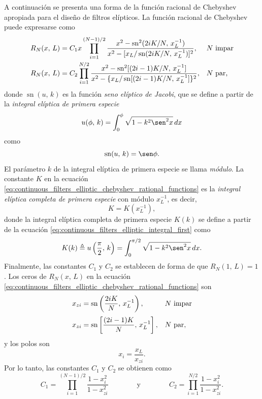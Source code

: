 \documentclass[a4paper]{report}
\begin{document}
A continuación se presenta una forma de la función racional de Chebyshev apropiada para el diseño de filtros elípticos. La función racional de Chebyshev puede expresarse como
\begin{equation}\label{eq:continuous_filters_elliptic_chebyshev_rational_functions}
 \begin{array}{ll}
  \displaystyle R_N(x,\,L)=C_1x\prod_{i=1}^{(N-1)/2}\frac{x^2-\operatorname{sn}^2(2iK/N,\,x_L^{-1})}{x^2-[x_L/\operatorname{sn}(2iK/N,\,x_L^{-1})]^2},& N\textrm{ impar}\\[\bigskipamount]
  \displaystyle R_N(x,\,L)=C_2\prod_{i=1}^{N/2}\frac{x^2-\operatorname{sn}^2[(2i-1)K/N,\,x_L^{-1}]}{x^2-\{x_L/\operatorname{sn}[(2i-1)K/N,\,x_L^{-1}]\}^2},& N\textrm{ par,}
 \end{array}
\end{equation}
donde \(\operatorname{sn}(u,\,k)\) es la función \emph{seno elíptico de Jacobi}, que se define a partir de la \emph{integral elíptica de primera especie}
\begin{equation}\label{eq:continuous_filters_elliptic_integral_first}
 u(\phi,\,k)=\int_0^\phi\sqrt{1-k^2\sen^2x}\,dx
\end{equation}
como
\begin{equation}\label{eq:continuous_filters_elliptic_sine}
 \operatorname{sn}(u,\,k)=\sen\phi. 
\end{equation}
El parámetro \(k\) de la integral elíptica de primera especie se llama \emph{módulo}. La constante \(K\) en la ecuación \ref{eq:continuous_filters_elliptic_chebyshev_rational_functions} es la \emph{integral elíptica completa de primera especie} con módulo \(x_L^{-1}\), es decir,
\[
 K=K(x_L^{-1}),
\]
donde la integral elíptica completa de primera especie \(K(k)\) se define a partir de la ecuación \ref{eq:continuous_filters_elliptic_integral_first} como 
\begin{equation}\label{eq:continuous_filters_elliptic_integral_first_complete}
 K(k)\triangleq u\left(\frac{\pi}{2},\,k\right)=\int_0^{\pi/2}\sqrt{1-k^2\sen^2x}\,dx. 
\end{equation}
Finalmente, las constantes \(C_1\) y \(C_2\) se establecen de forma de que \(R_N(1,\,L)=1\). Los ceros de \(R_N(x,\,L)\) en la ecuación \ref{eq:continuous_filters_elliptic_chebyshev_rational_functions} son
\[
 \begin{array}{ll}
  \displaystyle x_{zi}=\operatorname{sn}\left(\frac{2iK}{N},\,x_L^{-1}\right),& N\textrm{ impar}\\[\bigskipamount]
  \displaystyle x_{zi}=\operatorname{sn}\left[\frac{(2i-1)K}{N},\,x_L^{-1}\right],& N\textrm{ par,}
 \end{array}
\]
y los polos son
\[
 x_i=\frac{x_L}{x_{zi}}.
\]
Por lo tanto, las constantes \(C_1\) y \(C_2\) se obtienen como
\begin{equation}\label{eq:continuous_filters_elliptic_chebyshev_rational_functions_C}
 C_1=\prod_{i=1}^{(N-1)/2}\frac{1-x_i^2}{1-x_{zi}^2}
 \qquad\qquad\textrm{y}\qquad\qquad
 C_2=\prod_{i=1}^{N/2}\frac{1-x_i^2}{1-x_{zi}^2}.
\end{equation}
\end{document}
